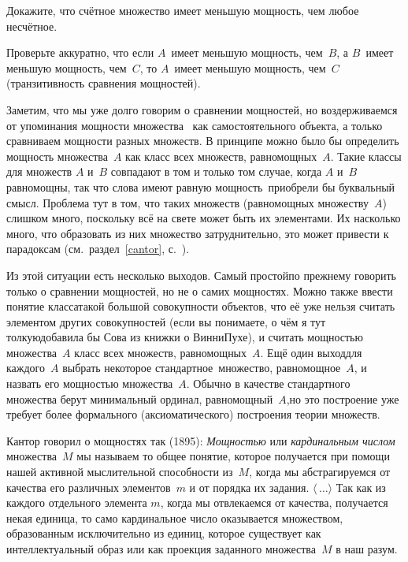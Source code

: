 \begin{problem}
Докажите, что счётное множество имеет меньшую мощность,
чем любое несчётное.
\end{problem}

\begin{problem}
Проверьте аккуратно, что если $A$~имеет меньшую мощность, чем~$B$,
а $B$~имеет меньшую мощность, чем~$C$, то $A$~имеет меньшую
мощность, чем~$C$ (транзитивность сравнения мощностей).
\end{problem}

Заметим, что мы уже долго говорим о сравнении мощностей, но
воздерживаемся от упоминания  мощности множества%
\ как
самостоятельного объекта, а только сравниваем мощности разных
множеств. В принципе можно было бы определить мощность
множества~$A$ как класс всех множеств, равномощных~$A$. Такие
классы для множеств $A$ и~$B$ совпадают в том и только том случае,
когда $A$ и~$B$ равномощны, так что слова  имеют
равную мощность\ приобрели бы буквальный смысл. Проблема тут
в том, что таких множеств (равномощных множеству~$A$) слишком
много, поскольку всё на свете может быть их элементами. Их
насколько много, что образовать из них множество затруднительно,
это может привести к парадоксам (см.~раздел~\ref{cantor},
с.~\pageref{russell-paradox}).

Из этой ситуации есть несколько выходов. Самый простой\т по\д
прежнему говорить только о сравнении мощностей, но не о самих
мощностях. Можно также ввести понятие  класса\т такой
большой совокупности объектов, что её уже нельзя считать
элементом других совокупностей ( если вы понимаете, о чём я
тут толкую\т добавила бы Сова из книжки о Винни\д Пухе), и считать
мощностью множества~$A$ класс всех множеств, равномощных~$A$.
Ещё один выход\т для каждого~$A$ выбрать некоторое 
стандартное\ множество, равномощное~$A$, и назвать его
мощностью множества~$A$. Обычно в качестве стандартного
множества берут минимальный ординал, равномощный~$A$,\т но это
построение уже требует более формального (аксиоматического)
построения теории множеств.

\begin{historyremark}
Кантор говорил о мощностях так (1895): 
\emph{Мощностью}
или \emph{кардинальным числом}
множества~$M$ мы называем то
общее понятие, которое получается при помощи нашей активной
мыслительной способности из~$M$, когда мы абстрагируемся от
качества его различных элементов~$m$ и от порядка их задания.
$\langle\,\dots\rangle$ Так как из каждого отдельного элемента
$m$, когда мы отвлекаемся от качества, получается некая
\glqq единица\grqq, то само кардинальное число оказывается
множеством, образованным исключительно из единиц, которое
существует как интеллектуальный образ или как проекция заданного
множества~$M$ в наш разум.
\end{historyremark}

